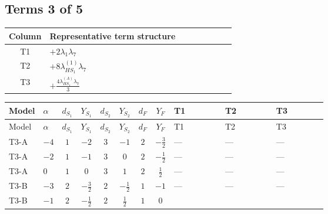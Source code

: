 \documentclass[8pt]{article}
\begin{document}
\begin{landscape}
\subsection*{Terms 3 of 5}
\begin{center}
\begin{tabular}{@{}c >{\raggedright\arraybackslash}p{0.82\linewidth}@{}}
\toprule
Column & Representative term structure \\
\midrule
T1 & \(\displaystyle +2 {\lambda_1} {\lambda_{7}}\) \\
\midrule
T2 & \(\displaystyle +8 {\lambda_{HS_1}^{(1)}} {\lambda_{7}}\) \\
\midrule
T3 & \(\displaystyle +\frac{4 {\lambda_{HS_1}^{(A)}} {\lambda_{7}}}{3}\) \\
\midrule
\bottomrule
\end{tabular}
\end{center}
\smallskip
\tiny
\begin{longtable}{@{}llcccccc >{\raggedright\arraybackslash}p{0.21\linewidth} >{\raggedright\arraybackslash}p{0.21\linewidth} >{\raggedright\arraybackslash}p{0.21\linewidth}@{}}
\toprule
Model & $\alpha$ & $d_{S_1}$ & $Y_{S_1}$ & $d_{S_2}$ & $Y_{S_2}$ & $d_F$ & $Y_F$ & T1 & T2 & T3 \\
\midrule
\endfirsthead
\toprule
Model & $\alpha$ & $d_{S_1}$ & $Y_{S_1}$ & $d_{S_2}$ & $Y_{S_2}$ & $d_F$ & $Y_F$ & T1 & T2 & T3 \\
\midrule
\endhead
T3-A & $-4$ & $1$ & $-2$ & $3$ & $-1$ & $2$ & $-\frac{3}{2}$ & --- & --- & --- \\
\midrule
T3-A & $-2$ & $1$ & $-1$ & $3$ & $0$ & $2$ & $-\frac{1}{2}$ & --- & --- & --- \\
\midrule
T3-A & $0$ & $1$ & $0$ & $3$ & $1$ & $2$ & $\frac{1}{2}$ & --- & --- & --- \\
\midrule
T3-B & $-3$ & $2$ & $-\frac{3}{2}$ & $2$ & $-\frac{1}{2}$ & $1$ & $-1$ & --- & --- & --- \\
\midrule
T3-B & $-1$ & $2$ & $-\frac{1}{2}$ & $2$ & $\frac{1}{2}$ & $1$ & $0$ & \scriptsize\adjustbox{max width=\linewidth}{$\begin{gathered} +2 {\lambda_1} {\lambda_{7}}\end{gathered}$} & \scriptsize\adjustbox{max width=\linewidth}{$\begin{gathered} +8 {\lambda_{HS_1}^{(1)}} {\lambda_{7}}\end{gathered}$} & \scriptsize\adjustbox{max width=\linewidth}{$\begin{gathered} +\frac{4 {\lambda_{HS_1}^{(A)}} {\lambda_{7}}}{3}\end{gathered}$} \\

\end{longtable}
\end{landscape}
\end{document}
